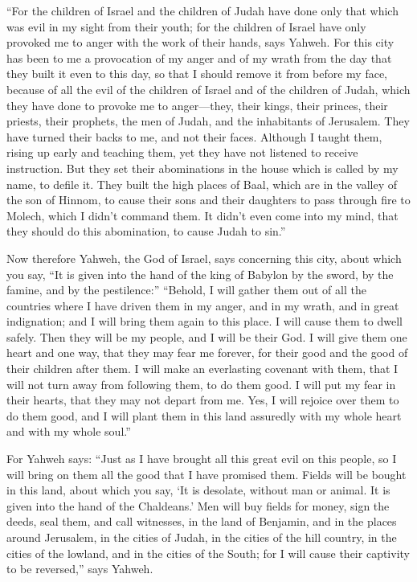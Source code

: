  ``For the children of Israel and the children of Judah
have done only that which was evil in my sight from their youth; for the
children of Israel have only provoked me to anger with the work of their
hands, says Yahweh.  For this city has been to me a
provocation of my anger and of my wrath from the day that they built it
even to this day, so that I should remove it from before my face,
 because of all the evil of the children of Israel and of
the children of Judah, which they have done to provoke me to
anger---they, their kings, their princes, their priests, their prophets,
the men of Judah, and the inhabitants of Jerusalem.  They
have turned their backs to me, and not their faces. Although I taught
them, rising up early and teaching them, yet they have not listened to
receive instruction.  But they set their abominations in
the house which is called by my name, to defile it.  They
built the high places of Baal, which are in the valley of the son of
Hinnom, to cause their sons and their daughters to pass through fire to
Molech, which I didn't command them. It didn't even come into my mind,
that they should do this abomination, to cause Judah to sin.''

 Now therefore Yahweh, the God of Israel, says concerning
this city, about which you say, ``It is given into the hand of the king
of Babylon by the sword, by the famine, and by the pestilence:''
 ``Behold, I will gather them out of all the countries
where I have driven them in my anger, and in my wrath, and in great
indignation; and I will bring them again to this place. I will cause
them to dwell safely.  Then they will be my people, and I
will be their God.  I will give them one heart and one
way, that they may fear me forever, for their good and the good of their
children after them.  I will make an everlasting covenant
with them, that I will not turn away from following them, to do them
good. I will put my fear in their hearts, that they may not depart from
me.  Yes, I will rejoice over them to do them good, and I
will plant them in this land assuredly with my whole heart and with my
whole soul.''

 For Yahweh says: ``Just as I have brought all this great
evil on this people, so I will bring on them all the good that I have
promised them.  Fields will be bought in this land, about
which you say, `It is desolate, without man or animal. It is given into
the hand of the Chaldeans.'  Men will buy fields for
money, sign the deeds, seal them, and call witnesses, in the land of
Benjamin, and in the places around Jerusalem, in the cities of Judah, in
the cities of the hill country, in the cities of the lowland, and in the
cities of the South; for I will cause their captivity to be reversed,''
says Yahweh.

